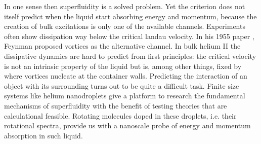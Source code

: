 In one sense then superfluidity is a solved problem. Yet the criterion does not itself predict when the liquid start absorbing energy and momentum, because the creation of bulk excitations is only one of the available channels. Experiments often show dissipation way below the critical landau velocity\cite{mcclintockIonsSuperfluidHelium1984}. In his 1955 paper \cite{feynmanChapterIIApplication1955}, Feynman proposed vortices as the alternative channel. In bulk helium II the dissipative dynamics are hard to predict from first principles: the critical velocity is not an intrinsic property of the liquid but is, among other things, fixed by where vortices nucleate at the container walls. Predicting the interaction of an object with its surrounding turns out to be quite a difficult task. Finite size systems like helium nanodroplets give a platform to research the fundamental mechanisms of superfluidity with the benefit of testing theories that are calculational feasible. Rotating molecules doped in these droplets, i.e. their rotational spectra, provide us with a nanoscale probe of energy and momentum absorption in such liquid. 

